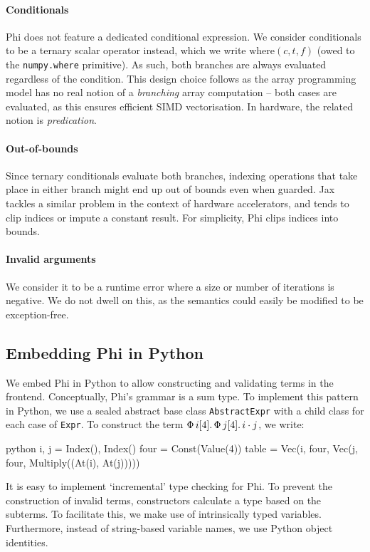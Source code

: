 \paragraph{Conditionals} Phi does not feature a dedicated conditional expression. We consider conditionals to be a ternary scalar operator instead, which we write $\mathrm{where}(c, t, f)$ (owed to the \texttt{numpy.where} primitive). As such, both branches are always evaluated regardless of the condition. This design choice follows as the array programming model has no real notion of a \textit{branching} array computation -- both cases are evaluated, as this ensures efficient SIMD vectorisation. In hardware, the related notion is \textit{predication}.

\paragraph{Out-of-bounds} Since ternary conditionals evaluate both branches, indexing operations that take place in either branch might end up out of bounds even when guarded. 
Jax tackles a similar problem in the context of hardware accelerators, 
and tends to clip indices or impute a constant result. 
For simplicity, Phi clips indices into bounds.

\paragraph{Invalid arguments} We consider it to be a runtime error where a size or number of iterations is negative. We do not dwell on this, as the semantics could easily be modified to be exception-free.

\subsection{Embedding Phi in Python}
\label{embedding-phi}

We embed Phi in Python to allow constructing and validating terms in the frontend. Conceptually, Phi's grammar is a sum type. To implement this pattern in Python, we use a sealed abstract base class \texttt{AbstractExpr} with a child class for each case of \texttt{Expr}. To construct the term $\Phi\, {i}[{4}] \ldotp {\Phi\, {j}[{4}] \ldotp {i \cdot j}}$, we write:
\begin{center}
\begin{cminted}{python}
i, j = Index(), Index()
four = Const(Value(4))
table = Vec(i, four, Vec(j, four, Multiply((At(i), At(j)))))
\end{cminted}
\end{center}
It is easy to implement `incremental' type checking for Phi. 
To prevent the construction of invalid terms, constructors calculate a type based on the subterms. To facilitate this, we make use of intrinsically typed variables. 
Furthermore, instead of string-based variable names, we use Python object identities.



